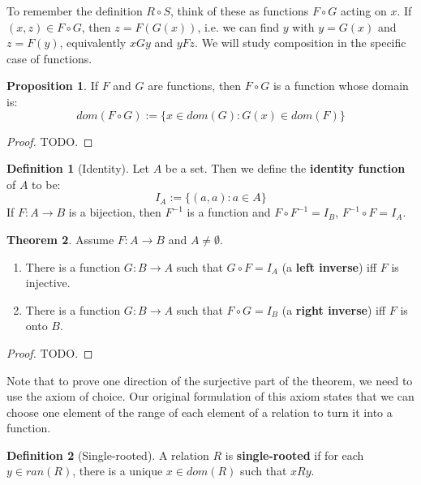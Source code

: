 \documentclass[11pt, oneside]{article}   	%
\theoremstyle{definition}
\newtheorem{definition}{Definition}[section]
\newtheorem{theorem}{Theorem}[section]
\newtheorem{prop}[theorem]{Proposition}
\begin{document}
To remember the definition $R\circ S$, think of these as functions $F\circ G$ acting on $x$. If $(x, z)\in F\circ G$, then $z = 
F(G(x))$, i.e. we can find $y$ with $y = G(x)$ and $z = F(y)$, equivalently $x G y$ and $y F z$. We will study composition 
in the specific case of functions.

\begin{prop}
	If $F$ and $G$ are functions, then $F\circ G$ is a function whose domain is:
	\begin{equation}
		dom(F\circ G) := \{x\in dom(G) : G(x)\in dom(F)\}
	\end{equation}
\end{prop}
\begin{proof}
	TODO.
\end{proof}

\begin{definition}[Identity]
	Let $A$ be a set. Then we define the \textbf{identity function} of $A$ to be:
	\begin{equation}
		I_A := \{(a, a) : a\in A\}
	\end{equation}
	If $F : A\rightarrow B$ is a bijection, then $F^{-1}$ is a function and $F\circ F^{-1} = I_B$, $F^{-1}\circ F = I_A$. 
\end{definition}

\begin{theorem}
	Assume $F : A\rightarrow B$ and $A\neq\emptyset$. 
	\begin{enumerate}
		\item There is a function $G : B\rightarrow A$ such that $G\circ F = I_A$ (a \textbf{left inverse}) iff $F$ is injective.
		\item There is a function $G : B\rightarrow A$ such that $F\circ G = I_B$ (a \textbf{right inverse}) iff $F$ is onto $B$. 
	\end{enumerate}
\end{theorem}

\begin{proof}
	TODO. 
\end{proof}

Note that to prove one direction of the surjective part of the theorem, we need to use the axiom of choice. Our original 
formulation of this axiom states that we can choose one element of the range of each element of a relation to turn it into a 
function.

\begin{definition}[Single-rooted]
	A relation $R$ is \textbf{single-rooted} if for each $y\in ran(R)$, there is a unique $x\in dom(R)$ such that $x R y$. 
\end{definition}
\end{document}
